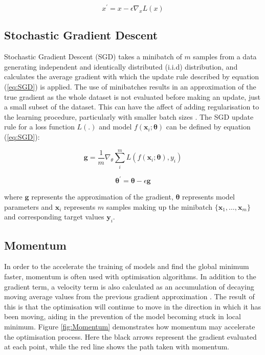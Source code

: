 \begin{equation}\label{eq:gradient_descent}
   x^\prime = x - \epsilon \nabla_x L(x)
\end{equation}

\subsection{Stochastic Gradient Descent}
Stochastic Gradient Descent (SGD) takes a minibatch of $m$ samples from a data generating independent and identically distributed (i.i.d) distribution, and calculates the average gradient with which the update rule described by equation (\ref{eq:SGD}) is applied.
The use of minibatches results in an approximation of the true gradient as the whole dataset is not evaluated before making an update, just a small subset of the dataset.
This can have the affect of adding regularisation to the learning procedure, particularly with smaller batch sizes \cite{Goodfellow-et-al-2016}.
The SGD update rule for a loss function $L(.)$ and model $f(\bm{x}_i; \bm{\theta})$ can be defined by equation (\ref{eq:SGD}):

\begin{equation*}
    \bm{g} = \frac{1}{m} \nabla_\theta \sum_i^m L(f(\bm{x}_i; \bm{\theta}), y_i)
\end{equation*}

\begin{equation}\label{eq:SGD}
    \bm{\theta}^\prime = \bm{\theta} - \epsilon \bm{g}
\end{equation}

where $\bm{g}$ represents the approximation of the gradient, $\bm{\theta}$ represents model parameters and $\bm{x}_i$ represents $m$ samples making up the minibatch $\{\bm{x}_1, \dots, \bm{x}_m\}$ and corresponding target values $\bm{y}_i$.

\subsection{Momentum}
In order to the accelerate the training of models and find the global minimum faster, momentum is often used with optimisation algorithms.
In addition to the gradient term, a velocity term is also calculated as an accumulation of decaying moving average values from the previous gradient approximation \cite{Goodfellow-et-al-2016}.
The result of this is that the optimisation will continue to move in the direction in which it has been moving, aiding in the prevention of the model becoming stuck in local minimum.
Figure \ref{fig:Momentum} demonstrates how momentum may accelerate the optimisation process.
Here the black arrows represent the gradient evaluated at each point, while the red line shows the path taken with momentum.

